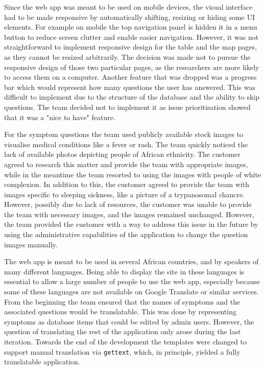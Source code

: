 \documentclass{l3proj}
\begin{document}



Since the web app was meant to be used on mobile devices, the visual interface had to be made responsive by automatically shifting, resizing or hiding some UI elements. For example on mobile the top navigation panel is hidden it in a menu button to reduce screen clutter and enable easier navigation. However, it was not straightforward to implement responsive design for the table and the map pages, as they cannot be resized arbitrarily. The decision was made not to pursue the responsive design of those two particular pages, as the researchers are more likely to access them on a computer. Another feature that was dropped was a progress bar which would represent how many questions the user has answered. This was difficult to implement due to the structure of the database and the ability to skip questions. The team decided not to implement it as issue prioritisation showed that it was a "nice to have" feature.

For the symptom questions the team used publicly available stock images to visualise medical conditions like a fever or rash. The team quickly noticed the lack of available photos depicting people of African ethnicity. The customer agreed to research this matter and provide the team with appropriate images, while in the meantime the team resorted to using the images with people of white complexion. In addition to this, the customer agreed to provide the team with images specific to sleeping sickness, like a picture of a trypanosomal chancre. However, possibly due to lack of resources, the customer was unable to provide the team with necessary images, and the images remained unchanged. However, the team provided the customer with a way to address this issue in the future by using the administrative capabilities of the application to change the question images manually.

The web app is meant to be used in several African countries, and by speakers of many different languages. Being able to display the site in these languages is essential to allow a large number of people to use the web app, especially because some of these languages are not available on Google Translate or similar services. From the beginning the team ensured that the names of symptoms and the associated questions would be translatable. This was done by representing symptoms as database items that could be edited by admin users. However, the question of translating the rest of the application only arose during the last iteration. Towards the end of the development the templates were changed to support manual translation via \texttt{gettext}, which, in principle, yielded a fully translatable application. 
\end{document}
